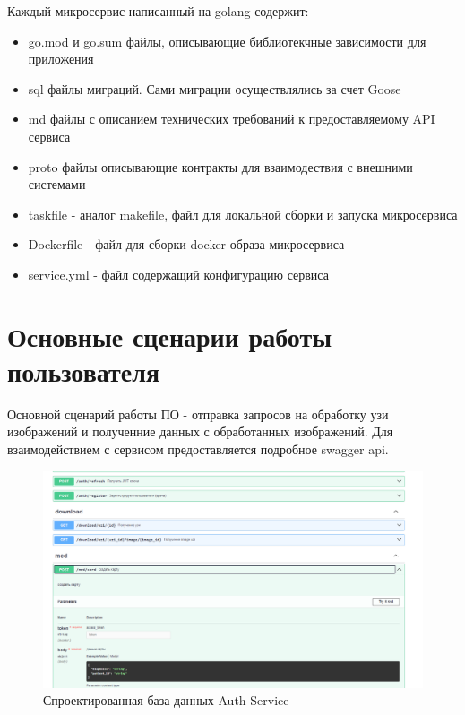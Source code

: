 Каждый микросервис написанный на golang содержит:
\begin{itemize}
  \item go.mod и go.sum файлы, описывающие библиотекчные зависимости для приложения
  \item sql файлы миграций. Сами миграции осуществлялись за счет Goose
  \item md файлы с описанием технических требований к предоставляемому API сервиса
  \item proto файлы описывающие контракты для взаимодествия с внешними системами
  \item taskfile - аналог makefile, файл для локальной сборки и запуска микросервиса
  \item Dockerfile - файл для сборки docker образа микросервиса
  \item service.yml - файл содержащий конфигурацию сервиса
\end{itemize}






\section{Основные сценарии работы пользователя}
Основной сценарий работы ПО - отправка запросов на обработку узи изображений и полученние данных с
обработанных изображений. Для взаимодействием с сервисом предоставляется подробное swagger api.
\begin{figure}[H]%
	\begin{center}
		\includegraphics[width=.9\columnwidth]{./img/swagger.png}%
	\end{center}
	\caption{Спроектированная база данных Auth Service}%
	\label{pic:auth_model}%
\end{figure}

